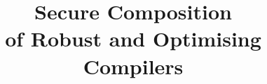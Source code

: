\documentclass[dvipsnames]{llncs}
\begin{document}
\linenumbers

\title{Secure Composition \\ of Robust and Optimising Compilers}

\author{}

\institute{}


\maketitle
\end{document}
